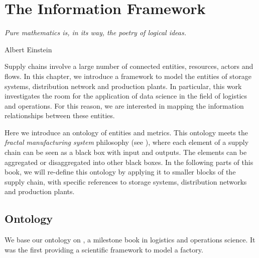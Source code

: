 \chapter{The Information Framework} \label{chap_InformationFramework}

\epigraph{\textit{Pure mathematics is, in its way, the poetry of logical ideas.}}{Albert Einstein}


Supply chains involve a large number of connected entities, resources, actors and flows.  In this chapter, we introduce a framework to model the entities of storage systems, distribution network and production plants. In particular, this work investigates the room for the application of data science in the field of logistics and operations. For this reason, we are interested in mapping the information relationships between these entities.\par

Here we introduce an ontology of entities and metrics. This ontology meets the \textit{fractal manufacturing system} philosophy (see \cite{Sprock2018}), where each element of a supply chain can be seen as a black box with input and outputs. The elements can be aggregated or disaggregated into other black boxes. In the following parts of this book, we will re-define this ontology by applying it to smaller blocks of the supply chain, with specific references to storage systems, distribution networks and production plants.

\section{Ontology}\label{secOntology}
We base our ontology on \cite{Hopp2011}, a milestone book in logistics and operations science. It was the first providing a scientific framework to model a factory. 

